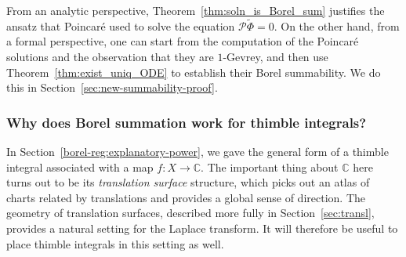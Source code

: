 \documentclass{article}
\newcommand{\maps}{\colon}
\newcommand{\C}{\mathbb{C}}
\newcommand{\series}[1]{\tilde{#1}}
\theoremstyle{definition}
\theoremstyle{plain}
\begin{document}
From an analytic perspective, Theorem~\ref{thm:soln_is_Borel_sum} justifies the ansatz that Poincar\'{e} used to solve the equation $\mathcal{P}\series{\Phi} = 0$. On the other hand, from a formal perspective, one can start from the computation of the Poincar\'{e} solutions and the observation that they are $1$-Gevrey, and then use Theorem~\ref{thm:exist_uniq_ODE} to establish their Borel summability. We do this in Section~\ref{sec:new-summability-proof}.
\subsubsection{Why does Borel summation work for thimble integrals?}\label{sec:why_borel_thimble}
In Section~\ref{borel-reg:explanatory-power}, we gave the general form of a thimble integral associated with a map $f \maps X \to \C$. The important thing about $\C$ here turns out to be its {\em translation surface} structure, which picks out an atlas of charts related by translations and provides a global sense of direction. The geometry of translation surfaces, described more fully in Section~\ref{sec:transl}, provides a natural setting for the Laplace transform. It will therefore be useful to place thimble integrals in this setting as well.
\end{document}
